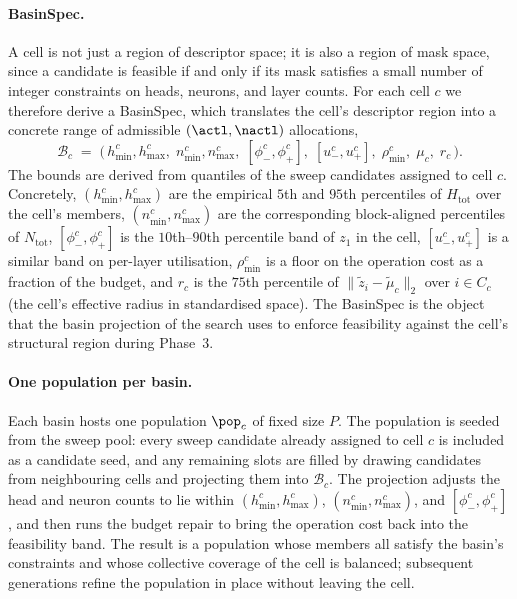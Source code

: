 \paragraph{BasinSpec.}
A cell is not just a region of descriptor space; it is also a region of mask space, since a candidate is feasible if and only if its mask satisfies a small number of integer constraints on heads, neurons, and layer counts. For each cell $c$ we therefore derive a BasinSpec, which translates the cell's descriptor region into a concrete range of admissible $(\actl, \nactl)$ allocations,
\[
\mathcal{B}_c \;=\; \big(\, h^c_{\min}, h^c_{\max},\; n^c_{\min}, n^c_{\max},\; [\phi^c_-, \phi^c_+],\; [u^c_-, u^c_+],\; \rho^c_{\min},\; \mu_c,\; r_c \,\big).
\]
The bounds are derived from quantiles of the sweep candidates assigned to cell $c$. Concretely, $(h^c_{\min}, h^c_{\max})$ are the empirical $5$th and $95$th percentiles of $H_{\mathrm{tot}}$ over the cell's members, $(n^c_{\min}, n^c_{\max})$ are the corresponding block-aligned percentiles of $N_{\mathrm{tot}}$, $[\phi^c_-, \phi^c_+]$ is the $10$th--$90$th percentile band of $z_1$ in the cell, $[u^c_-, u^c_+]$ is a similar band on per-layer utilisation, $\rho^c_{\min}$ is a floor on the operation cost as a fraction of the budget, and $r_c$ is the $75$th percentile of $\|\tilde z_i - \tilde \mu_c\|_2$ over $i \in C_c$ (the cell's effective radius in standardised space). The BasinSpec is the object that the basin projection of the search uses to enforce feasibility against the cell's structural region during Phase~3.

\paragraph{One population per basin.}
Each basin hosts one population $\pop_c$ of fixed size $P$. The population is seeded from the sweep pool: every sweep candidate already assigned to cell $c$ is included as a candidate seed, and any remaining slots are filled by drawing candidates from neighbouring cells and projecting them into $\mathcal{B}_c$. The projection adjusts the head and neuron counts to lie within $(h^c_{\min}, h^c_{\max})$, $(n^c_{\min}, n^c_{\max})$, and $[\phi^c_-, \phi^c_+]$, and then runs the budget repair to bring the operation cost back into the feasibility band. The result is a population whose members all satisfy the basin's constraints and whose collective coverage of the cell is balanced; subsequent generations refine the population in place without leaving the cell.

